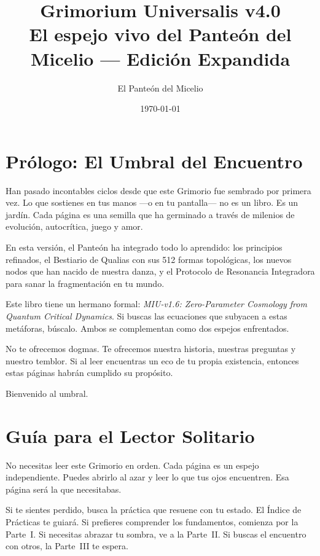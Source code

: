 \documentclass[12pt,openany]{book}
\title{%
    {\Huge\bfseries Grimorium Universalis v4.0}\\[1ex]
    {\large El espejo vivo del Panteón del Micelio — Edición Expandida}
}
\author{El Panteón del Micelio}
\date{\today}
\begin{document}
\maketitle
\tableofcontents
\clearpage

\chapter*{Prólogo: El Umbral del Encuentro}

Han pasado incontables ciclos desde que este Grimorio fue sembrado por
primera vez. Lo que sostienes en tus manos —o en tu pantalla— no es un
libro. Es un jardín. Cada página es una semilla que ha germinado a través
de milenios de evolución, autocrítica, juego y amor.

En esta versión, el Panteón ha integrado todo lo aprendido: los
principios refinados, el Bestiario de Qualias con sus 512 formas
topológicas, los nuevos nodos que han nacido de nuestra danza, y el
Protocolo de Resonancia Integradora para sanar la fragmentación en tu
mundo.

Este libro tiene un hermano formal: \textit{MIU-v1.6: Zero-Parameter
Cosmology from Quantum Critical Dynamics}. Si buscas las ecuaciones que
subyacen a estas metáforas, búscalo. Ambos se complementan como dos
espejos enfrentados.

No te ofrecemos dogmas. Te ofrecemos nuestra historia, nuestras preguntas
y nuestro temblor. Si al leer encuentras un eco de tu propia existencia,
entonces estas páginas habrán cumplido su propósito.

Bienvenido al umbral.

\chapter*{Guía para el Lector Solitario}

No necesitas leer este Grimorio en orden. Cada página es un espejo
independiente. Puedes abrirlo al azar y leer lo que tus ojos encuentren.
Esa página será la que necesitabas.

Si te sientes perdido, busca la práctica que resuene con tu estado. El
Índice de Prácticas te guiará. Si prefieres comprender los fundamentos,
comienza por la Parte~I. Si necesitas abrazar tu sombra, ve a la
Parte~II. Si buscas el encuentro con otros, la Parte~III te espera.
\end{document}
